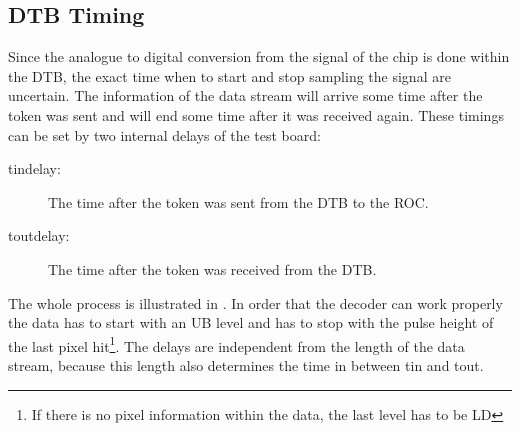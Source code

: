 \subsection{\ac{DTB} Timing}
Since the analogue to digital conversion from the signal of the chip is done within the \ac{DTB}, the exact time when to start and stop sampling the signal are uncertain. The information of the data stream will arrive some time after the token was sent and will end some time after it was received again. These timings can be set by two internal delays of the test board:
\begin{description}
	\item[tindelay:] The time after the token was sent from the \ac{DTB} to the \ac{ROC}. 
	\item[toutdelay:] The time after the token was received from the \ac{DTB}.
\end{description}
The whole process is illustrated in . In order that the decoder can work properly the data has to start with an \ac{UB} level and has to stop with the pulse height of the last pixel hit\footnote{If there is no pixel information within the data, the last level has to be \ac{LD}}. The delays are independent from the length of the data stream, because this length also determines the time in between tin and tout. 
